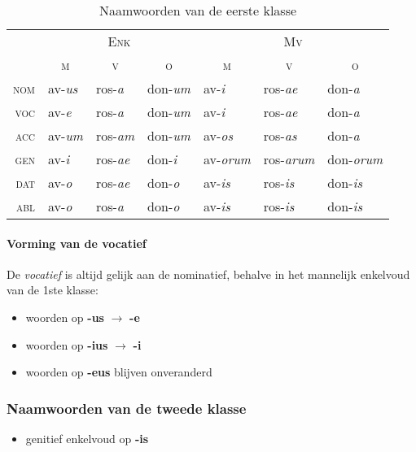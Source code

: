 \documentclass[12pt,a4paper]{article}
\begin{document}
\begin{table}[H]
\centering
\begin{tabular}{ r | l l l | l l l }
\toprule
 & \multicolumn{3}{c|}{\textsc{Enk}} & \multicolumn{3}{c}{\textsc{Mv}} \\
 & \multicolumn{1}{c}{\textsc{m}} & \multicolumn{1}{c}{\textsc{v}} & \multicolumn{1}{c|}{\textsc{o}} & \multicolumn{1}{c}{\textsc{m}} & \multicolumn{1}{c}{\textsc{v}} & \multicolumn{1}{c}{\textsc{o}} \\ 
\midrule
\textsc{nom} & av-\emph{us} & ros-\emph{a}  & don-\emph{um} & av-\emph{i}    & ros-\emph{ae}   & don-\emph{a}    \\
\textsc{voc} & av-\emph{e}  & ros-\emph{a}  & don-\emph{um} & av-\emph{i}    & ros-\emph{ae}   & don-\emph{a}    \\
\textsc{acc} & av-\emph{um} & ros-\emph{am} & don-\emph{um} & av-\emph{os}   & ros-\emph{as}   & don-\emph{a}    \\
\textsc{gen} & av-\emph{i}  & ros-\emph{ae} & don-\emph{i}  & av-\emph{orum} & ros-\emph{arum} & don-\emph{orum} \\
\textsc{dat} & av-\emph{o}  & ros-\emph{ae} & don-\emph{o}  & av-\emph{is}   & ros-\emph{is}   & don-\emph{is}   \\
\textsc{abl} & av-\emph{o}  & ros-\emph{a}  & don-\emph{o}  & av-\emph{is}   & ros-\emph{is}   & don-\emph{is}   \\
\bottomrule
\end{tabular}
\caption{Naamwoorden van de eerste klasse}
\label{tab:nw1}
\end{table}

\paragraph{Vorming van de vocatief} De \emph{vocatief} is altijd gelijk aan de nominatief, behalve in het mannelijk enkelvoud van de 1ste klasse:
\begin{itemize}
    \item woorden op \textbf{-us}  $\rightarrow$ \textbf{-e}
    \item woorden op \textbf{-ius} $\rightarrow$ \textbf{-i}
    \item woorden op \textbf{-eus} blijven onveranderd
\end{itemize}


\subsubsection{Naamwoorden van de tweede klasse}
\begin{itemize}
    \item genitief enkelvoud op \textbf{-is}
\end{itemize}
\end{document}

